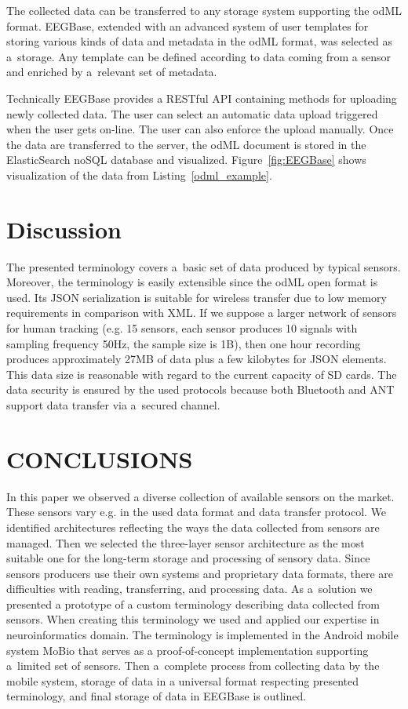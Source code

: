 \documentclass[a4paper,twoside]{article}
\begin{document}
The collected data can be transferred to any storage system supporting the odML format. EEGBase, extended with an advanced system of user templates for storing various kinds of data and metadata in the odML format, was selected as a~storage. Any template can be defined according to data coming from a sensor and enriched by a~relevant set of metadata.

Technically EEGBase provides a RESTful API containing methods for uploading newly collected data. The user can select an automatic data upload triggered when the user gets on-line. The user can also enforce the upload manually. Once the data are transferred to the server, the odML document is stored in the ElasticSearch noSQL database and visualized. Figure~\ref{fig:EEGBase} shows visualization of the data from Listing~\ref{odml_example}.


\section{Discussion}
The presented terminology covers a~basic set of data produced by typical sensors. Moreover, the terminology is easily extensible since the odML open format is used. Its JSON serialization is suitable for wireless transfer due to low memory requirements in comparison with XML. If we suppose a larger network of sensors for human tracking (e.g. 15 sensors, each sensor produces 10 signals with sampling frequency 50Hz, the sample size is 1B), then one hour recording produces approximately 27MB of data plus a few kilobytes for JSON elements. This data size is reasonable with regard to the current capacity of SD cards. The data security is ensured by the used protocols because both Bluetooth and ANT support data transfer via a~secured channel.

\section{\uppercase{Conclusions}}
\label{sec:conclusion}

\noindent
In this paper we observed a diverse collection of available sensors on the market. These sensors vary e.g. in the used data format and data transfer protocol. We identified architectures reflecting the ways the data collected from sensors are managed. Then we selected the three-layer sensor architecture as the most suitable one for the long-term storage and processing of sensory data. Since sensors producers use their own systems and proprietary data formats, there are difficulties with reading, transferring, and processing data. As a~solution we presented a prototype of a custom terminology describing data collected from sensors. When creating this terminology we used and applied our expertise in neuroinformatics domain. The terminology is implemented in the Android mobile system MoBio that serves as a proof-of-concept implementation supporting a~limited set of sensors. Then a~complete process from collecting data by the mobile system, storage of data in a universal format respecting presented terminology, and final storage of data in EEGBase is outlined.
\end{document}
